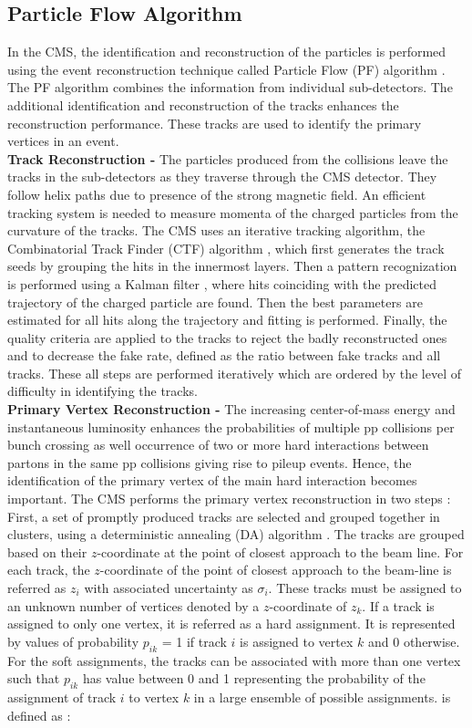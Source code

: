 \subsection{Particle Flow Algorithm}
In the CMS, the identification and reconstruction of the particles is performed using the event reconstruction technique called Particle Flow (PF) algorithm \cite{CMS:2009nxa, CMS:2010byl}. %
The PF algorithm combines the information from individual sub-detectors. The additional identification and reconstruction of the tracks enhances the reconstruction performance. These tracks are used to identify the primary vertices in an event. \\ \newline
{\bf Track Reconstruction -} The particles produced from the collisions leave the tracks in the sub-detectors as they traverse through the CMS detector. They follow helix paths due to presence of the strong magnetic field. An efficient tracking system is needed to measure momenta of the charged particles from the curvature of the tracks. The CMS uses an iterative tracking algorithm, the Combinatorial Track Finder (CTF) algorithm \cite{Adam:2005cg}, which first generates the track seeds by grouping the hits in the innermost layers. Then a pattern recognization is performed using a Kalman filter \cite{Fruhwirth:1987fm}, where hits coinciding with the predicted trajectory of the charged particle are found. Then the best parameters are estimated for all hits along the trajectory and fitting is performed. Finally, the quality criteria are applied to the tracks to reject the badly reconstructed ones and to decrease the fake rate, defined as the ratio between fake tracks and all tracks. These all steps are performed iteratively which are ordered by the level of difficulty in identifying the
tracks. \\ \newline
{\bf Primary Vertex Reconstruction -} The increasing center-of-mass energy and instantaneous luminosity enhances the probabilities of multiple pp collisions per bunch crossing as well occurrence of two or more hard interactions between partons in the same pp collisions giving rise to pileup events. Hence, the identification of the primary vertex of the main hard interaction becomes important. The CMS performs the primary vertex reconstruction in two steps : First, a set of promptly produced tracks are selected and grouped together in clusters, using a deterministic annealing (DA) algorithm \cite{KRose}. The tracks are grouped based on their $z$-coordinate at the point of closest approach to the beam line. For each track, the $z$-coordinate of the point of closest approach to the beam-line is referred as $z_i$ with associated uncertainty as $\sigma_i$. These tracks must be assigned to an unknown number of vertices denoted by a $z$-coordinate of $z_k$. If a track is assigned to only one vertex, it is referred as a hard assignment. It is represented by values of probability $p_{ik}$ = 1 if track $i$ is assigned to vertex $k$ and 0 otherwise. For the soft assignments, the tracks can be associated with more than one vertex such that $p_{ik}$ has value between 0 and 1 representing the probability of the assignment of track $i$ to vertex $k$ in a large ensemble of possible assignments. \chisq is defined as :
